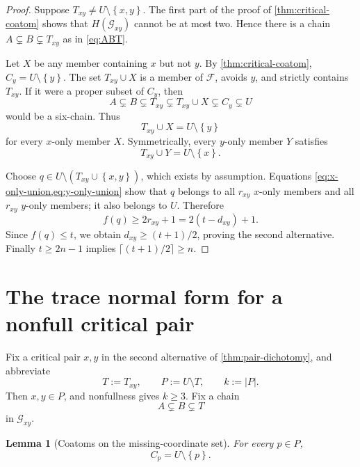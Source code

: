 \documentclass[11pt,reqno]{amsart}
\numberwithin{equation}{section}
\newtheorem{lemma}[lemma]{Lemma}
\theoremstyle{definition}
\theoremstyle{remark}
\newcommand{\F}{\mathcal{F}}
\newcommand{\G}{\mathcal{G}}
\newcommand{\1}{\mathbf{1}}
\newcommand{\set}[1]{\left\{#1\right\}}
\newcommand{\abs}[1]{\left|#1\right|}
\begin{document}
\begin{proof}
Suppose \(T_{xy}\ne U\setminus\set{x,y}\).  The first part of the proof of \cref{thm:critical-coatom} shows that \(H(\G_{xy})\) cannot be at most two.  Hence there is a chain \(A\subsetneq B\subsetneq T_{xy}\) as in \cref{eq:ABT}.

Let \(X\) be any member containing \(x\) but not \(y\).  By \cref{thm:critical-coatom}, \(C_y=U\setminus\set{y}\).  The set \(T_{xy}\cup X\) is a member of \(\F\), avoids \(y\), and strictly contains \(T_{xy}\).  If it were a proper subset of \(C_y\), then
\[
A\subsetneq B\subsetneq T_{xy}
\subsetneq T_{xy}\cup X
\subsetneq C_y
\subsetneq U
\]
would be a six-chain.  Thus
\begin{equation}\label{eq:x-only-union}
T_{xy}\cup X=U\setminus\set{y}
\end{equation}
for every \(x\)-only member \(X\).  Symmetrically, every \(y\)-only member \(Y\) satisfies
\begin{equation}\label{eq:y-only-union}
T_{xy}\cup Y=U\setminus\set{x}.
\end{equation}

Choose
\(
q\in U\setminus(T_{xy}\cup\set{x,y})
\), which exists by assumption.  Equations \cref{eq:x-only-union,eq:y-only-union} show that \(q\) belongs to all \(r_{xy}\) \(x\)-only members and all \(r_{xy}\) \(y\)-only members; it also belongs to \(U\).  Therefore
\[
f(q)\ge 2r_{xy}+1=2(t-d_{xy})+1.
\]
Since \(f(q)\le t\), we obtain \(d_{xy}\ge(t+1)/2\), proving the second alternative.  Finally \(t\ge2n-1\) implies \(\lceil(t+1)/2\rceil\ge n\).
\end{proof}

\section{The trace normal form for a nonfull critical pair}

Fix a critical pair \(x,y\) in the second alternative of \cref{thm:pair-dichotomy}, and abbreviate
\begin{equation}\label{eq:T-P}
T:=T_{xy},
\qquad
P:=U\setminus T,
\qquad
k:=\abs{P}.
\end{equation}
Then \(x,y\in P\), and nonfullness gives \(k\ge3\).  Fix a chain
\begin{equation}\label{eq:fixed-ABT}
A\subsetneq B\subsetneq T
\end{equation}
in \(\G_{xy}\).

\begin{lemma}[Coatoms on the missing-coordinate set]\label{lem:P-coatoms}
For every \(p\in P\),
\begin{equation}\label{eq:P-coatom}
C_p=U\setminus\set{p}.
\end{equation}
\end{lemma}
\end{document}
